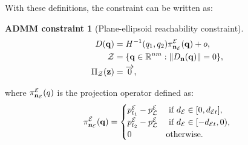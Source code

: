 \documentclass[10pt,twocolumn,twoside]{IEEEtran}
\newtheorem{constraint}{ADMM constraint}
\def\sZ{\mathcal{Z}}
\begin{document}
With these definitions, the constraint can be written as:
\begin{constraint}[Plane-ellipsoid reachability constraint]
\begin{align}
D(\vq) &= H^{-1}(q_{1},q_2)\pi^\cE_{\vn_\cE}(\vq)+o, \label{eq:plane_ellipsoid_constraint}\\
  \sZ &= \{\vq\in\mathbb{R}^{nm}:\norm{D_{\vn}(\vq)} = 0 \},\\
   \Pi_\sZ(\vz) & = \overrightarrow{0}, 
\end{align}
\end{constraint}
where $\pi^{\mathcal{E}}_{\mathbf{n}_{\mathcal{E}}}(q)$ is the projection operator defined as:
  \begin{equation}\label{equ:plane2ellipse}
    \pi^{\mathcal{E}}_{\mathbf{n}_{\mathcal{E}}}(\mathbf{q}) =\begin{cases}
      p^{\mathcal{E}}_{t_1}-p^{\mathcal{E}}_{\mathcal{L}} & \textrm{ if } d_{\mathcal{E}} \in [0, d_{\mathcal{E} t}], \\
      p^{\mathcal{E}}_{t_2}-p^{\mathcal{E}}_{\mathcal{L}} &  \textrm{ if } d_{\mathcal{E}} \in [- d_{\mathcal{E} t},0), \\
      {0} & \textrm{otherwise}.
    \end{cases}
  \end{equation}
\end{document}

